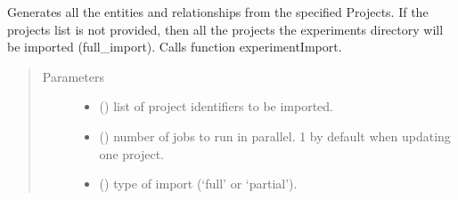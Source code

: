 \documentclass[letterpaper,10pt,english]{sphinxmanual}
\begin{document}

\begin{fulllineitems}
\label{\detokenize{_autosummary/graphdb_builder.builder:graphdb_builder.builder.importer.experimentsImport}}
Generates all the entities and relationships from the specified Projects. If the projects list is    not provided, then all the projects the experiments directory will be imported (full\_import).     Calls function experimentImport.
\begin{quote}\begin{description}
\item[{Parameters}] \leavevmode\begin{itemize}
\item {} 
 () \textendash{} list of project identifiers to be imported.

\item {} 
 () \textendash{} number of jobs to run in parallel. 1 by default when updating one project.

\item {} 
 () \textendash{} type of import (‘full’ or ‘partial’).

\end{itemize}

\end{description}\end{quote}

\end{fulllineitems}

\end{document}
